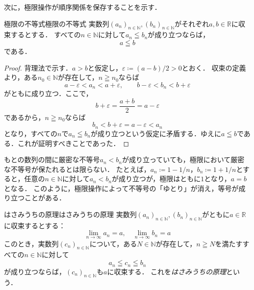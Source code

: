 次に，極限操作が順序関係を保存することを示す．

\begin{theorem}{極限の不等式}{極限の不等式}
  実数列$(a_n)_{n \in \mathbb{N}},(b_n)_{n \in \mathbb{N}}$がそれぞれ$a,b \in \mathbb{R}$に収束するとする．
  すべての$n \in \mathbb{N}$に対して$a_n \leqq b_n$が成り立つならば，
  \[
    a \leqq b
  \]
  である．
\end{theorem}

\begin{tleftbar}
  \begin{proof}
    背理法で示す．$a > b$と仮定し，$\varepsilon \coloneqq (a-b)/2 > 0$とおく．
    収束の定義より，ある$n_0 \in \mathbb{N}$が存在して，$n \geqq n_0$ならば
    \[
      a - \varepsilon < a_n < a + \varepsilon,
      \qquad
      b - \varepsilon < b_n < b + \varepsilon
    \]
    がともに成り立つ．ここで，
    \[
      b + \varepsilon = \frac{a+b}{2} = a - \varepsilon
    \]
    であるから，$n \geqq n_0$ならば
    \[
      b_n < b + \varepsilon = a - \varepsilon < a_n
    \]
    となり，すべての$n$で$a_n \leqq b_n$が成り立つという仮定に矛盾する．ゆえに$a \leqq b$である．これが証明すべきことであった．
  \end{proof}
\end{tleftbar}

\begin{remark}[厳密な不等号は極限で保存されない]
  もとの数列の間に厳密な不等号$a_n < b_n$が成り立っていても，極限において厳密な不等号が保たれるとは限らない．
  たとえば，$a_n \coloneqq 1 - 1/n$，$b_n \coloneqq 1 + 1/n$とすると，任意の$n \in \mathbb{N}$に対して$a_n < b_n$が成り立つが，極限はともに$1$となり，$a = b$となる．
  このように，極限操作によって不等号の「ゆとり」が消え，等号が成り立つことがある．
\end{remark}

\begin{theorem}{はさみうちの原理}{はさみうちの原理}
  実数列$(a_n)_{n \in \mathbb{N}},(b_n)_{n \in \mathbb{N}}$がともに$a \in \mathbb{R}$に収束するとする：
  \[
    \lim_{n \to \infty} a_n = a, \quad \lim_{n \to \infty} b_n = a
  \]
  このとき，実数列$(c_n)_{n \in \mathbb{N}}$について，ある$N \in \mathbb{N}$が存在して，$n \geqq N$を満たすすべての$n \in \mathbb{N}$に対して
  \[
    a_n \leqq c_n \leqq b_n
  \]
  が成り立つならば，$(c_n)_{n \in \mathbb{N}}$も$a$に収束する．
  これを\emph{はさみうちの原理}という．
\end{theorem}

